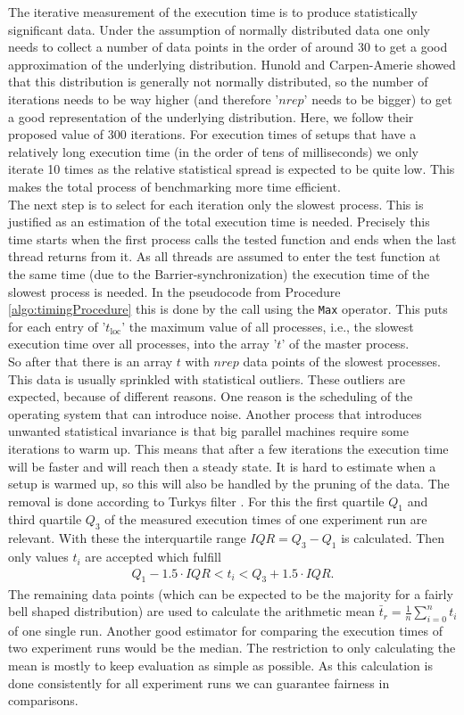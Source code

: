 The iterative measurement of the execution time is to produce statistically significant data. Under the assumption of normally distributed data one only needs to collect a number of data points in the order of around 30 to get a good approximation of the underlying distribution. Hunold and Carpen-Amerie \cite{HunoldBarrier} showed that this distribution is generally not normally distributed, so the number of iterations needs to be way higher (and therefore '$nrep$' needs to be bigger) to get a good representation of the underlying distribution. Here, we follow their proposed value of 300 iterations. For execution times of setups that have a relatively long execution time (in the order of tens of milliseconds) we only iterate 10 times as the relative statistical spread is expected to be quite low. This makes the total process of benchmarking more time efficient.\\
The next step is to select for each iteration only the slowest process. This is justified as an estimation of the total execution time is needed. Precisely this time starts when the first process calls the tested function and ends when the last thread returns from it. As all threads are assumed to enter the test function at the same time (due to the Barrier-synchronization) the execution time of the slowest process is needed. In the pseudocode from Procedure \ref{algo:timingProcedure} this is done by the  call using the \texttt{Max} operator. This puts for each entry of '$t_\mathrm{loc}$' the maximum value of all processes, i.e., the slowest execution time over all processes, into the array '$t$' of the master process.\\
So after that there is an array $t$ with $nrep$ data points of the slowest processes. This data is usually sprinkled with statistical outliers. These outliers are expected, because of different reasons. One reason is the scheduling of the operating system that can introduce noise. Another process that introduces unwanted statistical invariance is that big parallel machines require some iterations to warm up. This means  that after a few iterations the execution time will be faster and will reach then a steady state. It is hard to estimate when a setup is warmed up, so this will also be handled by the pruning of the data. The removal is done according to Turkys filter \cite[p.126]{TurkyRule}. For this the first quartile $Q_1$ and third quartile $Q_3$ of the measured execution times of one experiment run are relevant. With these the interquartile range $IQR = Q_3 - Q_1$ is calculated. Then only values $t_i$ are accepted which fulfill
\begin{align*}
	Q_1 - 1.5\cdot IQR < t_i < Q_3 + 1.5 \cdot IQR.
\end{align*} 
The remaining data points (which can be expected to be the majority for a fairly bell shaped distribution) are used to calculate the arithmetic mean $\bar{t}_r = \frac{1}{n} \sum_{i=0}^n t_i $ of one single run. Another good estimator for comparing the execution times of two experiment runs would be the median. The restriction to only calculating the mean is mostly to keep evaluation as simple as possible. As this calculation is done consistently for all experiment runs we can guarantee fairness in comparisons. 


